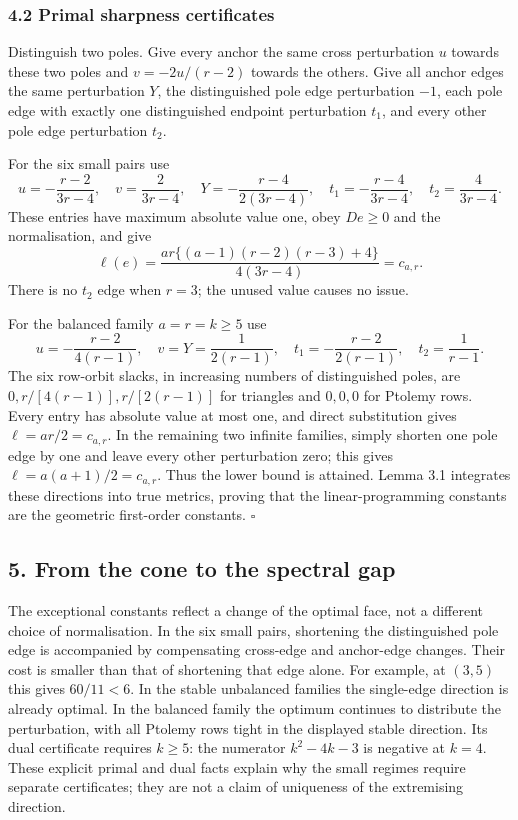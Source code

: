 \documentclass[11pt,a4paper]{article}
\begin{document}
\subsubsection{4.2 Primal sharpness
certificates}\label{primal-sharpness-certificates}

Distinguish two poles. Give every anchor the same cross perturbation
\(u\) towards these two poles and \(v=-2u/(r-2)\) towards the others.
Give all anchor edges the same perturbation \(Y\), the distinguished
pole edge perturbation \(-1\), each pole edge with exactly one
distinguished endpoint perturbation \(t_1\), and every other pole edge
perturbation \(t_2\).

For the six small pairs use
\[u=-\frac{r-2}{3r-4},\quad v=\frac2{3r-4},\quad
Y=-\frac{r-4}{2(3r-4)},\quad t_1=-\frac{r-4}{3r-4},\quad t_2=\frac4{3r-4}.\]
These entries have maximum absolute value one, obey \(De\ge0\) and the
normalisation, and give
\[\ell(e)=\frac{ar\{(a-1)(r-2)(r-3)+4\}}{4(3r-4)}=c_{a,r}.\] There is no
\(t_2\) edge when \(r=3\); the unused value causes no issue.

For the balanced family \(a=r=k\ge5\) use
\[u=-\frac{r-2}{4(r-1)},\quad v=Y=\frac1{2(r-1)},\quad
 t_1=-\frac{r-2}{2(r-1)},\quad t_2=\frac1{r-1}.\] The six row-orbit
slacks, in increasing numbers of distinguished poles, are
\(0,r/[4(r-1)],r/[2(r-1)]\) for triangles and \(0,0,0\) for Ptolemy
rows. Every entry has absolute value at most one, and direct
substitution gives \(\ell=ar/2=c_{a,r}\). In the remaining two infinite
families, simply shorten one pole edge by one and leave every other
perturbation zero; this gives \(\ell=a(a+1)/2=c_{a,r}\). Thus the lower
bound is attained. Lemma 3.1 integrates these directions into true
metrics, proving that the linear-programming constants are the geometric
first-order constants. \(\square\)

\subsection{5. From the cone to the spectral
gap}\label{from-the-cone-to-the-spectral-gap}

The exceptional constants reflect a change of the optimal face, not a
different choice of normalisation. In the six small pairs, shortening
the distinguished pole edge is accompanied by compensating cross-edge
and anchor-edge changes. Their cost is smaller than that of shortening
that edge alone. For example, at \((3,5)\) this gives \(60/11<6\). In
the stable unbalanced families the single-edge direction is already
optimal. In the balanced family the optimum continues to distribute the
perturbation, with all Ptolemy rows tight in the displayed stable
direction. Its dual certificate requires \(k\ge5\): the numerator
\(k^2-4k-3\) is negative at \(k=4\). These explicit primal and dual
facts explain why the small regimes require separate certificates; they
are not a claim of uniqueness of the extremising direction.
\end{document}
